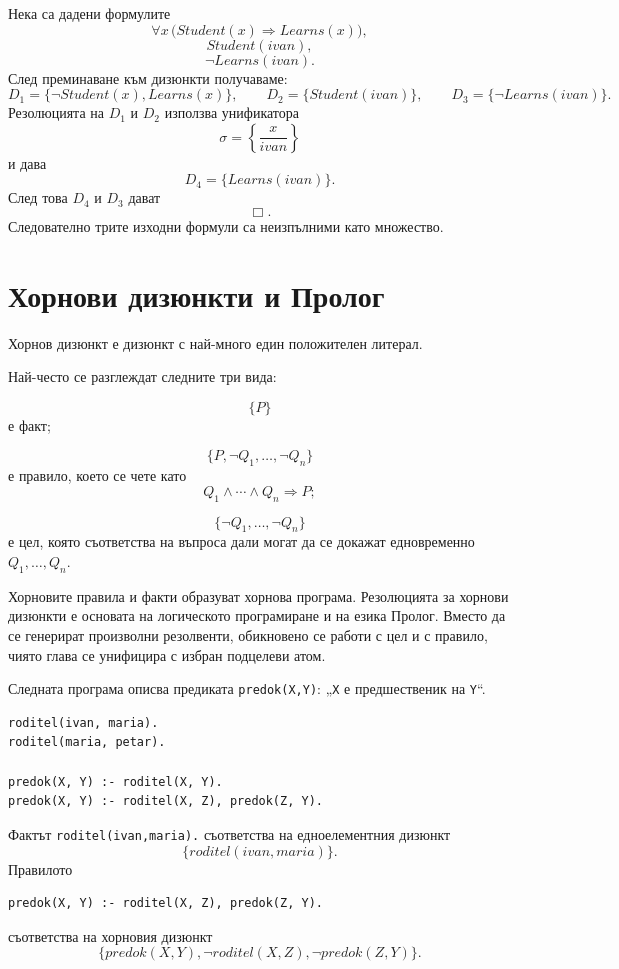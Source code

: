 \begin{example}
Нека са дадени формулите
\[
\forall x\,\bigl(Student(x)\Rightarrow Learns(x)\bigr),
\]
\[
Student(ivan),
\]
\[
\neg Learns(ivan).
\]
След преминаване към дизюнкти получаваме:
\[
D_1=\{\neg Student(x),Learns(x)\},
\qquad
D_2=\{Student(ivan)\},
\qquad
D_3=\{\neg Learns(ivan)\}.
\]
Резолюцията на $D_1$ и $D_2$ използва унификатора
\[
\sigma=\left\{\frac{x}{ivan}\right\}
\]
и дава
\[
D_4=\{Learns(ivan)\}.
\]
След това $D_4$ и $D_3$ дават
\[
\Box.
\]
Следователно трите изходни формули са неизпълними като множество.
\end{example}

\section{Хорнови дизюнкти и Пролог}\label{s:22.5}

\begin{defn}
Хорнов дизюнкт е дизюнкт с най-много един положителен литерал.
\end{defn}

Най-често се разглеждат следните три вида:

\[
\{P\}
\]
е факт;

\[
\{P,\neg Q_1,\ldots,\neg Q_n\}
\]
е правило, което се чете като
\[
Q_1\wedge\cdots\wedge Q_n\Rightarrow P;
\]

\[
\{\neg Q_1,\ldots,\neg Q_n\}
\]
е цел, която съответства на въпроса дали могат да се докажат едновременно $Q_1,\ldots,Q_n$.

Хорновите правила и факти образуват хорнова програма. Резолюцията за хорнови дизюнкти е основата на логическото програмиране и на езика Пролог. Вместо да се генерират произволни резолвенти, обикновено се работи с цел и с правило, чиято глава се унифицира с избран подцелеви атом.

\begin{example}
Следната програма описва предиката \verb|predok(X,Y)|: „\verb|X| е предшественик на \verb|Y|“.

\begin{verbatim}
roditel(ivan, maria).
roditel(maria, petar).

predok(X, Y) :- roditel(X, Y).
predok(X, Y) :- roditel(X, Z), predok(Z, Y).
\end{verbatim}

Фактът \verb|roditel(ivan,maria).| съответства на едноелементния дизюнкт
\[
\{roditel(ivan,maria)\}.
\]
Правилото
\begin{verbatim}
predok(X, Y) :- roditel(X, Z), predok(Z, Y).
\end{verbatim}
съответства на хорновия дизюнкт
\[
\{
predok(X,Y),
\neg roditel(X,Z),
\neg predok(Z,Y)
\}.
\]
\end{example}

